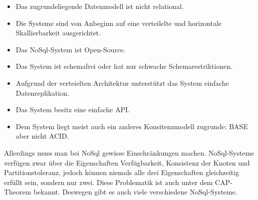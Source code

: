 \begin{itemize}
    \item Das zugrundeliegende Datenmodell ist nicht relational.
    \item Die Systeme sind von Anbeginn auf eine verteilelte und horizontale
        Skallierbarkeit ausgerichtet.
    \item Das NoSql-System ist Open-Source.
    \item Das System ist schemafrei oder hat nur schwache Schemarestriktionen.
    \item Aufgrund der verteielten Architektur unterstützt das System einfache
        Datenreplikation.
    \item Das System besitz eine einfache \gls{API}.
    \item Dem System liegt meist auch ein anderes Konsitenzmodell zugrunde:
        \gls{BASE} aber nicht \gls{ACID}.
\end{itemize}

Allerdings muss man bei NoSql gewisse Einschränkungen machen. NoSql-Systeme
verfügen zwar über die Eigenschaften Verfügbarkeit, Konsistenz der Knoten und
Partitionstoleranz, jedoch können niemals alle drei Eigenschaften gleichzeitig
erfüllt sein, sondern nur zwei. Diese Problematik ist auch unter
dem \gls{CAP}-Theorem bekannt. Deswegen gibt es auch viele verschiedene
NoSql-Systeme.


